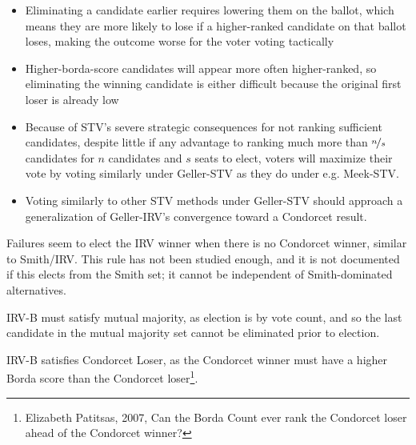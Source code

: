 \begin{itemize}
    \item Eliminating a candidate earlier requires lowering them on the ballot, which means they are more likely to lose if a higher-ranked candidate on that ballot loses, making the outcome worse for the voter voting tactically

    \item Higher-borda-score candidates will appear more often higher-ranked, so eliminating the winning candidate is either difficult because the original first loser is already low

    \item Because of STV's severe strategic consequences for not ranking sufficient candidates, despite little if any advantage to ranking much more than $\nicefrac{n}{s}$ candidates for $n$ candidates and $s$ seats to elect, voters will maximize their vote by voting similarly under Geller-STV as they do under e.g. Meek-STV.

    \item Voting similarly to other STV methods under Geller-STV should approach a generalization of Geller-IRV's convergence toward a Condorcet result.
\end{itemize}

Failures seem to elect the IRV winner when there is no Condorcet winner, similar to Smith/IRV.  This rule has not been studied enough, and it is not documented if this elects from the Smith set; it cannot be independent of Smith-dominated alternatives.

IRV-B must satisfy mutual majority, as election is by vote count, and so the last candidate in the mutual majority set cannot be eliminated prior to election.

IRV-B satisfies Condorcet Loser, as the Condorcet winner must have a higher Borda score than the Condorcet loser\footnote{Elizabeth Patitsas, 2007, Can the Borda Count ever rank the Condorcet loser ahead of the Condorcet winner?}.


%

